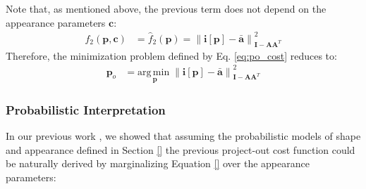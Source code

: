 Note that, as mentioned above, the previous term does not depend on the appearance parameters $\mathbf{c}$:
\begin{equation}
    \begin{aligned}
        f_2(\mathbf{p}, \mathbf{c}) & = \hat{f}_2(\mathbf{p}) = \left\| \mathbf{i}[\mathbf{p}] - \bar{\mathbf{a}} \right\|_{\mathbf{I} -\mathbf{A}\mathbf{A}^T }^2
    \label{eq:po_cost}
    \end{aligned}
\end{equation}
Therefore, the minimization problem defined by Eq. \ref{eq:po_cost} reduces to:
\begin{equation}
    \begin{aligned}
        \mathbf{p}_o & =  \underset{\mathbf{p}}{\mathrm{arg\,min\;}}  \left\| \mathbf{i}[\mathbf{p}] - \bar{\mathbf{a}} \right\|_{\mathbf{I} -\mathbf{A}\mathbf{A}^T }^2
    \label{eq:po_cost2}
    \end{aligned}
\end{equation}

\subsubsection*{Probabilistic Interpretation}
\label{sec:po_pi}

In our previous work \cite{Alabort2014}, we showed that assuming the probabilistic models of shape and appearance defined in Section \ref{} the previous project-out cost function could be naturally derived by marginalizing Equation \ref{} over the appearance parameters:

